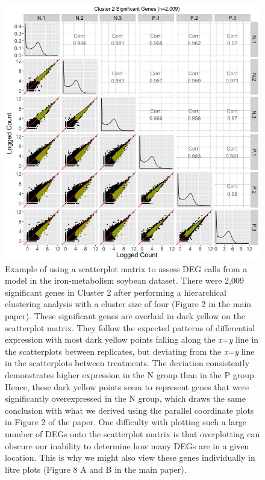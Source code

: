 \documentclass{article}
\begin{document}
  \begin{figure}[h!]
  \centerline{\includegraphics[width=\columnwidth]{../MakeFigures/sbIRClusterSigSM2.jpg}}
  \caption{Example of using a scatterplot matrix to assess DEG calls from a model in the iron-metabolism soybean dataset. There were 2,009 significant genes in Cluster 2 after performing a hierarchical clustering analysis with a cluster size of four (Figure 2 in the main paper). These significant genes are overlaid in dark yellow on the scatterplot matrix. They follow the expected patterns of differential expression with most dark yellow points falling along the \textit{x=y} line in the scatterplots between replicates, but deviating from the \textit{x=y} line in the scatterplots between treatments. The deviation consistently demonstrates higher expression in the N group than in the P group. Hence, these dark yellow points seem to represent genes that were significantly overexpressed in the N group, which draws the same conclusion with what we derived using the parallel coordinate plots in Figure 2 of the paper. One difficulty with plotting such a large number of DEGs onto the scatterplot matrix is that overplotting can obscure our inability to determine how many DEGs are in a given location. This is why we might also view these genes individually in litre plots (Figure 8 A and B in the main paper).
  \label{sbIRClusterSigSM2}}
  \end{figure}
  
\end{document}
